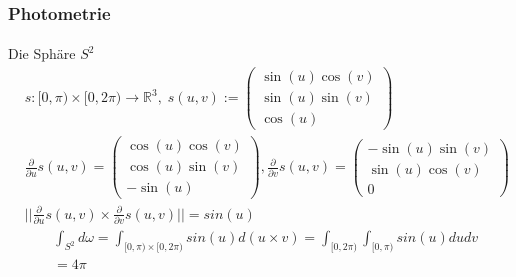 \documentclass{beamer}
\begin{document}
\begin{frame}
    \frametitle{Photometrie}
\framesubtitle{}
\begin{block}{Die  Sphäre $S^2$}
\begin{align*}
& s:  [0, \pi) \times  [0, 2 \pi)  \to \mathbb{R}^3 , \;
  s(u,v) :=  
 \begin{pmatrix}  \sin(u) \cos(v) \\   \sin(u) \sin(v) \\   \cos(u)  \end{pmatrix} \\
& \frac{\partial}{\partial u} s(u,v) =  \begin{pmatrix}  \cos(u) \cos(v) \\   \cos(u) \sin(v) \\   -\sin(u)  \end{pmatrix} , 
\frac{\partial}{\partial v} s(u,v) =  \begin{pmatrix}  -\sin(u) \sin(v) \\   \sin(u) \cos(v) \\   0  \end{pmatrix} \\
& ||\frac{\partial}{\partial u} s(u,v) \times \frac{\partial}{\partial v} s(u,v) || = sin(u)
\end{align*} 
\begin{align*}
& \int_{S^2} d\omega  = \int_{[0, \pi) \times  [0, 2 \pi) } sin(u) d(u \times v) =   \int_{[0, 2 \pi) }   \int_{[0, \pi) } sin(u) du dv \\ 
& = 4 \pi
\end{align*} 

\end{block}
\end{frame}
\end{document}
